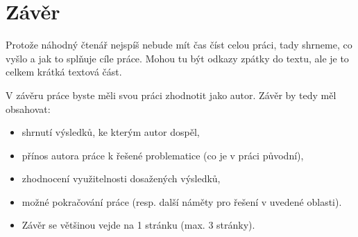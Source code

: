 \chapter{Závěr}
\label{sec:zaver}

\noindent Protože náhodný čtenář nejspíš nebude mít čas číst celou práci, tady shrneme, co vyšlo a jak to splňuje cíle práce. Mohou tu být odkazy zpátky do textu, ale je to celkem krátká textová část.

V závěru práce byste měli svou práci zhodnotit jako autor. Závěr by tedy měl obsahovat:
\begin{itemize}
\item shrnutí výsledků, ke kterým autor dospěl,
\item přínos autora práce k řešené problematice (co je v práci původní),
\item zhodnocení využitelnosti dosažených výsledků,
\item možné pokračování práce (resp. další náměty pro řešení v uvedené oblasti).
\item Závěr se většinou vejde na 1 stránku (max. 3 stránky).
\end{itemize}


